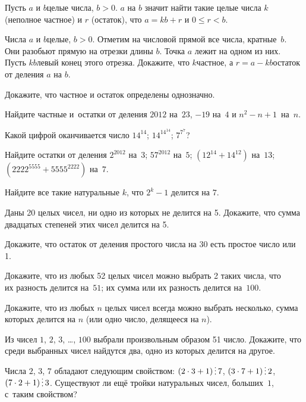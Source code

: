 \documentclass[a4paper,12pt]{article}
\begin{document}
Пусть $a$ и $b$\т целые числа, $b > 0$.  $a$ на $b$  значит найти такие целые числа $k$ (неполное частное) и $r$ (остаток), что $a = kb + r$ и $0\le r < b$.

Числа $a$ и $b$\т целые, $b>0$. Отметим на числовой прямой все числа, кратные~$b$. Они разобьют прямую на отрезки длины $b$. Точка $a$ лежит на одном из них. Пусть $kb$\т левый конец этого отрезка. Докажите, что $k$\т частное, а $r = a - kb$\т остаток от деления $a$ на $b$.

Докажите, что частное и остаток определены однозначно.

Найдите частные и~остатки от деления $2012$ на~$23$, $-19$ на~$4$ и $n^2-n+1$~на~$n$.

Какой цифрой оканчивается число
$14^{14}$;
$14^{14^{14}}$;
$7^{7^7}$?

Найдите остатки от деления
$2^{2012}$ на~$3$;
$57^{2012}$ на~$5$;
$(12^{14}+14^{12})$ на~$13$;\\
$(2222^{5555}+5555^{2222})$ на~$7$.

Найдите все такие натуральные $k$, что $2^k - 1$ делится на $7$.

Даны 20 целых чисел, ни одно из которых не делится на 5. Докажите, что сумма двадцатых степеней этих чисел делится на 5.

Докажите, что остаток от деления простого  числа на 30 есть простое число или 1.

Докажите, что из любых 52 целых чисел можно выбрать 2 таких числа, что\\
их разность делится на~$51$;
их сумма или их разность делится на~$100$.

Докажите, что из любых $n$ целых чисел всегда можно выбрать несколько, сумма которых делится на $n$ (или одно число, делящееся на $n$).

Из чисел $1$, $2$, $3$, \dots , $100$ выбрали произвольным образом 51 число. Докажите, что среди выбранных чисел найдутся два, одно из которых делится на другое.

Числа $2$, $3$, $7$ обладают следующим свойством: $(2\cdot3+1) \dv 7$, $(3\cdot7+1) \dv 2$, $(7\cdot2+1) \dv 3$. Существуют ли ещё тройки натуральных чисел, больших~$1$, с~таким свойством?

\vfill
{}
\end{document}

